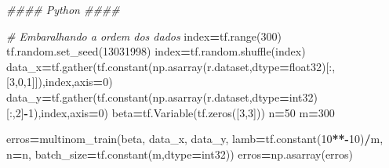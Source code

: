 \documentclass[
]{article}
\newenvironment{Shaded}{\begin{snugshade}}{\end{snugshade}}
\newcommand{\AttributeTok}[1]{\textcolor[rgb]{0.77,0.63,0.00}{#1}}
\newcommand{\BuiltInTok}[1]{#1}
\newcommand{\CommentTok}[1]{\textcolor[rgb]{0.56,0.35,0.01}{\textit{#1}}}
\newcommand{\DecValTok}[1]{\textcolor[rgb]{0.00,0.00,0.81}{#1}}
\newcommand{\DocumentationTok}[1]{\textcolor[rgb]{0.56,0.35,0.01}{\textbf{\textit{#1}}}}
\newcommand{\FunctionTok}[1]{\textcolor[rgb]{0.00,0.00,0.00}{#1}}
\newcommand{\NormalTok}[1]{#1}
\newcommand{\OperatorTok}[1]{\textcolor[rgb]{0.81,0.36,0.00}{\textbf{#1}}}
\newcommand{\SpecialCharTok}[1]{\textcolor[rgb]{0.00,0.00,0.00}{#1}}
\newcommand{\StringTok}[1]{\textcolor[rgb]{0.31,0.60,0.02}{#1}}
\begin{document}
\begin{Shaded}
\begin{Highlighting}[]
\CommentTok{\#\#\#\# Python \#\#\#\#}

\CommentTok{\# Embaralhando a ordem dos dados}
\NormalTok{index}\OperatorTok{=}\NormalTok{tf.}\BuiltInTok{range}\NormalTok{(}\DecValTok{300}\NormalTok{)}
\NormalTok{tf.random.set\_seed(}\DecValTok{13031998}\NormalTok{)}
\NormalTok{index}\OperatorTok{=}\NormalTok{tf.random.shuffle(index)}
\NormalTok{data\_x}\OperatorTok{=}\NormalTok{tf.gather(tf.constant(np.asarray(r.dataset,dtype}\OperatorTok{=}\StringTok{\textquotesingle{}float32\textquotesingle{}}\NormalTok{)[:,[}\DecValTok{3}\NormalTok{,}\DecValTok{0}\NormalTok{,}\DecValTok{1}\NormalTok{]]),index,axis}\OperatorTok{=}\DecValTok{0}\NormalTok{)}
\NormalTok{data\_y}\OperatorTok{=}\NormalTok{tf.gather(tf.constant(np.asarray(r.dataset,dtype}\OperatorTok{=}\StringTok{\textquotesingle{}int32\textquotesingle{}}\NormalTok{)[:,}\DecValTok{2}\NormalTok{]}\OperatorTok{{-}}\DecValTok{1}\NormalTok{),index,axis}\OperatorTok{=}\DecValTok{0}\NormalTok{)}
\NormalTok{beta}\OperatorTok{=}\NormalTok{tf.Variable(tf.zeros([}\DecValTok{3}\NormalTok{,}\DecValTok{3}\NormalTok{]))}
\NormalTok{n}\OperatorTok{=}\DecValTok{50}
\NormalTok{m}\OperatorTok{=}\DecValTok{300}

\NormalTok{erros}\OperatorTok{=}\NormalTok{multinom\_train(beta,}
\NormalTok{                     data\_x,}
\NormalTok{                     data\_y,}
\NormalTok{                     lamb}\OperatorTok{=}\NormalTok{tf.constant(}\DecValTok{10}\OperatorTok{**{-}}\DecValTok{10}\NormalTok{)}\OperatorTok{/}\NormalTok{m,}
\NormalTok{                     n}\OperatorTok{=}\NormalTok{n,}
\NormalTok{                     batch\_size}\OperatorTok{=}\NormalTok{tf.constant(m,dtype}\OperatorTok{=}\StringTok{\textquotesingle{}int32\textquotesingle{}}\NormalTok{))}
\NormalTok{erros}\OperatorTok{=}\NormalTok{np.asarray(erros)}
\end{Highlighting}
\end{Shaded}

\begin{Shaded}
\end{Shaded}
\end{document}
